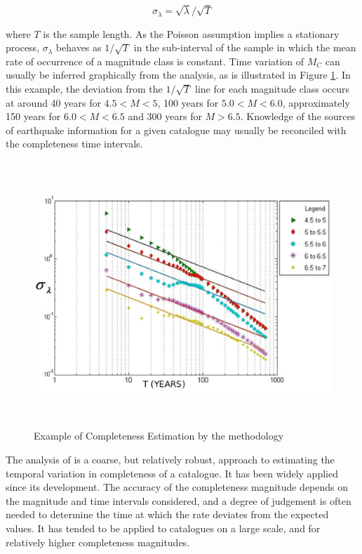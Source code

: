 \begin{equation}
   \sigma_{\lambda} = \sqrt{\lambda} / \sqrt{T}
\end{equation}

where $T$ is the sample length. As the Poisson assumption implies a stationary process, $\sigma_{\lambda}$ behaves as $1/\sqrt{T}$ in the sub-interval of the sample in which the mean rate of occurrence of a magnitude class is constant. Time variation of $M_C$ can usually be inferred graphically from the analysis, as is illustrated in Figure \ref{fig:SteppFigExample1}. In this example, the deviation from the $1/\sqrt{T}$ line for each magnitude class occurs at around 40 years  for $4.5 < M < 5$, 100 years for $5.0  < M < 6.0$, approximately 150 years for $6.0 < M < 6.5$ and 300 years for $M > 6.5$. Knowledge of the sources of earthquake information for a given catalogue may usually be reconciled with the completeness time intervals.

\begin{figure}[htb]
	\centering
		\includegraphics[height=10cm, keepaspectratio=true]{./figures/C2Fig1SteppFig1.eps}
	\caption{Example of Completeness Estimation by the \textcite{Stepp1971} methodology}
	\label{fig:SteppFigExample1}
\end{figure}

The analysis of \textcite{Stepp1971} is a coarse, but relatively robust, approach to estimating the temporal variation in completeness of a catalogue. It has been widely applied since its development. The accuracy of the completeness magnitude depends on the magnitude and time intervals considered, and a degree of judgement is often needed to determine the time at which the rate deviates from the expected values. It has tended to be applied to catalogues on a large scale, and for relatively higher completeness magnitudes. 

